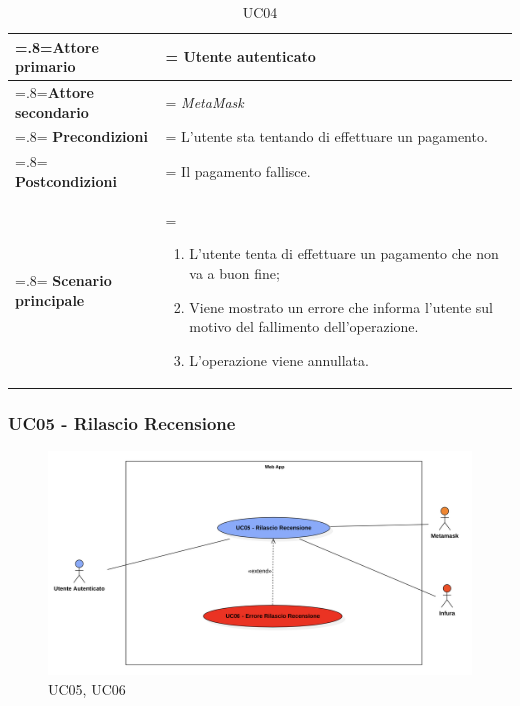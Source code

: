            \begin{table}[H]
                \centering
                \renewcommand{\arraystretch}{1.8}
                \renewcommand\tabularxcolumn[1]{m{#1}}
                \begin{tabularx}{0.9\textwidth} {
                    >{\hsize=.8\hsize\linewidth=\hsize}X
                    >{\hsize=1.2\hsize\linewidth=\hsize}X}
                    \hline
                    \textbf{Attore primario} & Utente autenticato \\
                    \hline
                    \textbf{Attore secondario} & \textit{MetaMask} \\
                    \hline
                    \textbf{Precondizioni} & L'utente sta tentando di effettuare un pagamento. \\
                    \hline
                    \textbf{Postcondizioni} & Il pagamento fallisce. \\
                    \hline
                    \textbf{Scenario principale} &
                    \begin{enumerate}
                        \item L'utente tenta di effettuare un pagamento che non va a buon fine;
                        \item Viene mostrato un errore che informa l'utente sul motivo del fallimento dell'operazione.
                        \item L'operazione viene annullata.
                    \end{enumerate} \\
                    \hline
                \end{tabularx}
                \caption{UC04}
            \end{table}

        \subsubsection{UC05 - Rilascio Recensione}
        \label{UC05}

            \begin{figure}[H]
                \centering
                \includegraphics[scale=0.4]{src/img/UC05.png}
                \caption{UC05, UC06}
            \end{figure}

